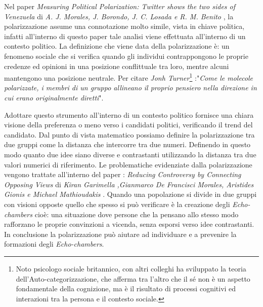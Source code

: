 Nel paper \textit{Measuring Political Polarization: Twitter shows the two sides of Venezuela} di \textit{A. J. Morales, J. Borondo, J. C. Losada e R. M. Benito} \cite{morales2015polarization}, la polarizzazione assume una connotazione molto simile, vista in chiave politica, infatti all'interno di questo paper tale analisi viene effettuata all'interno di un contesto politico. 
La definizione che viene data della polarizzazione è: 
un fenomeno sociale che si verifica quando gli individui contrappongono le proprie credenze ed opinioni in una posizione conflittuale tra loro, mentre alcuni mantengono una posizione neutrale.
Per citare \textit{Jonh Turner}\footnote{Noto psicologo sociale britannico, con altri colleghi ha sviluppato la teoria dell'Auto-categorizzazione, che afferma tra l'altro che il sé non è un aspetto fondamentale della cognizione, ma è il risultato di processi cognitivi ed interazioni tra la persona e il contesto sociale.} :"\textit{Come le molecole polarizzate, i membri di un gruppo allineano il proprio pensiero nella direzione in cui erano originalmente diretti}". 

Adottare questo strumento all'interno di un contesto politico fornisce una chiara visione della preferenza o meno verso i candidati politici, verificando il trend del candidato.
Dal punto di vista matematico possiamo definire la polarizzazione tra due gruppi come la distanza che intercorre tra due numeri. Definendo in questo modo quanto due idee siano diverse e contrastanti utilizzando la distanza tra due valori numerici di riferimento.
Le problematiche evidenziate dalla polarizzazione vengono trattate all'interno del paper : \textit{Reducing Controversy by Connecting Opposing Views} di \textit{Kiran Garimella ,Gianmarco De Francisci Morales, Aristides Gionis e Michael Mathioudakis} \cite{Garimella2015polarization}. Quando una popolazione si divide in due gruppi con visioni opposte quello che spesso si può verificare è la creazione degli \textit{Echo-chambers} cioè: una situazione dove persone che la pensano allo stesso modo rafforzano le proprie convinzioni a vicenda, senza esporsi verso idee contrastanti.
In conclusione la polarizzazione può aiutare ad individuare e a prevenire la formazioni degli \textit{Echo-chambers}.

